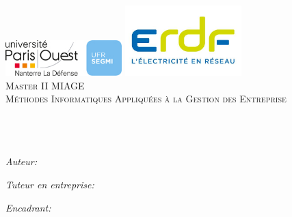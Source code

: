 \documentclass[11pt, oneside]{Thesis} %
\begin{document}
\begin{titlepage}
\begin{center}

\textsc{\LARGE \univname}\\[0.5cm] %
{\includegraphics[width=4.5cm]{segmi.jpg}} \bigskip
{\includegraphics[width=4.5cm]{erdf.jpg}}\\[.3cm]
\textsc{\Large Master II MIAGE}\\ %
\textsc{Méthodes Informatiques Appliquées à la Gestion des Entreprise}\\[0.5cm]

\HRule \\[0.4cm] %
{\huge \bfseries \ttitle}\\[0.4cm] %
\HRule \\[1.5cm] %
 
\begin{minipage}{0.3\textwidth}
\begin{flushleft} \large
\emph{Auteur:}\\
{\authornames} %
\end{flushleft}
\end{minipage}
\begin{minipage}{0.3\textwidth}
\begin{center} \large
\emph{Tuteur en entreprise:}\\
{\tutornames}
\end{center}
\end{minipage}
\begin{minipage}{0.3\textwidth}
\begin{flushright} \large
\emph{Encadrant:} \\
\href{https://pages.lip6.fr/Pascal.Poizat}{\supname} %
\end{flushright}
\end{minipage}\\[3cm]
 

\end{center}
\end{titlepage}
\end{document}
